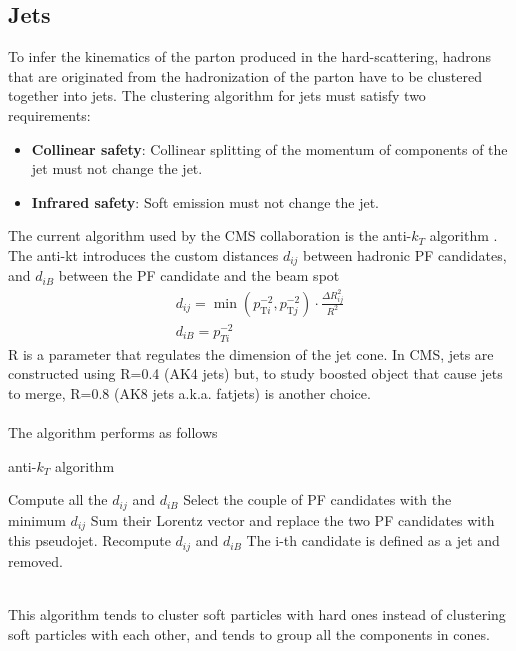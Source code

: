 \subsection{Jets}\label{sec:jets}
To infer the kinematics of the parton produced in the hard-scattering, hadrons that are originated from the hadronization of the parton have to be clustered together into jets.
The clustering algorithm for jets must satisfy two requirements:
\begin{itemize}
    \item \textbf{Collinear safety}: Collinear splitting of the momentum of components of the jet must not change the jet.
    \item \textbf{Infrared safety}: Soft emission must not change the jet.
\end{itemize}
The current algorithm used by the CMS collaboration is the anti-$k_T$ algorithm \cite{Cacciari2008TheAlgorithm}.\\
The anti-kt introduces the custom distances $d_{ij}$ between hadronic PF candidates, and $d_{iB}$ between the PF candidate and the beam spot 
\begin{gather}
    d_{i j}=\operatorname*{min}\left(p_{\mathrm{T}i}^{-2},p_{\mathrm{T}j}^{-2}\right)\cdot\frac{\Delta R_{i j}^{2}}{R^2}\\
    d_{iB}=p_{Ti}^{-2}
\end{gather}
R is a parameter that regulates the dimension of the jet cone. In CMS, jets are constructed using R=0.4 (AK4 jets) but, to study boosted object that cause jets to merge, R=0.8 (AK8 jets a.k.a. fatjets) is another choice.\\
\\
The algorithm performs as follows
\begin{algorithm}
\caption{anti-$k_T$ algorithm}\label{algo:akt}
\begin{algorithmic}[1]
    \State Compute all the $d_{ij}$ and $d_{iB}$
        \State Select the couple of PF candidates with the minimum $d_{ij}$
        \State Sum their Lorentz vector and replace the two PF candidates with this pseudojet.
        \State Recompute $d_{ij}$ and $d_{iB}$
            \State The i-th candidate is defined as a jet and removed.
        \EndIf
    \EndWhile
\end{algorithmic}
\end{algorithm}
\\
This algorithm tends to cluster soft particles with hard ones instead of clustering soft particles with each other, and tends to group all the components in cones.\\
